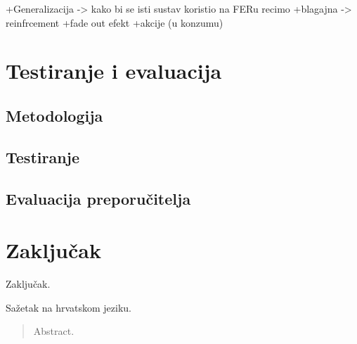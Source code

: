 \documentclass[times, utf8, diplomski, numeric]{fer}
\begin{document}
+Generalizacija -> kako bi se isti sustav koristio na FERu recimo
+blagajna -> reinfrcement
+fade out efekt
+akcije (u konzumu)
\chapter{Testiranje i evaluacija}
\section{Metodologija}
\section{Testiranje}
\section{Evaluacija preporučitelja}

\chapter{Zaključak}
Zaključak.




\begin{sazetak}
Sažetak na hrvatskom jeziku.

\end{sazetak}

\begin{abstract}
Abstract.

\end{abstract}
\end{document}
